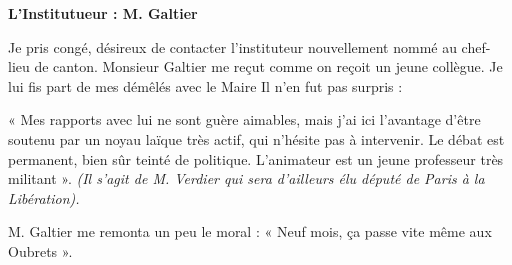 \textbf{L’Institutueur : M. Galtier}

Je pris congé, désireux de contacter l’instituteur nouvellement nommé au chef-lieu de canton.
Monsieur Galtier me reçut comme on reçoit un jeune collègue. Je lui fis part de mes démêlés
avec le Maire Il n’en fut pas surpris :

« Mes rapports avec lui ne sont guère aimables, mais j’ai ici l’avantage d’être soutenu par un
noyau laïque très actif, qui n’hésite pas à intervenir. Le débat est permanent, bien sûr teinté de
politique. L’animateur est un jeune professeur très militant ». \textit{(Il s’agit de M. Verdier qui sera
d’ailleurs élu député de Paris à la Libération).}

M. Galtier me remonta un peu le moral :
« Neuf mois, ça passe vite même aux Oubrets ».

